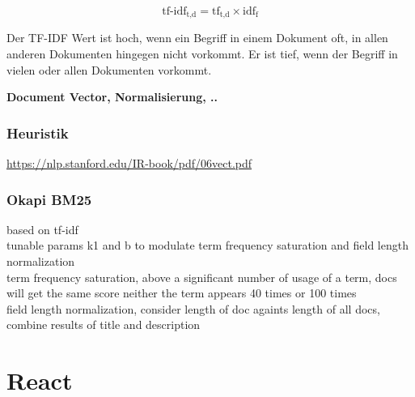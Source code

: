 \[
    \text{tf-idf}_{\text{t,d}} = \text{tf}_{\text{t,d}}\times\text{idf}_\text{f}
\]

Der TF-IDF Wert ist hoch, wenn ein Begriff in einem Dokument oft, in allen anderen Dokumenten hingegen nicht vorkommt. Er ist tief, wenn der Begriff in vielen oder allen Dokumenten vorkommt.


\textbf{Document Vector, Normalisierung, ..}

\cite{manning2008introduction}






\subsubsection{Heuristik}


\url{https://nlp.stanford.edu/IR-book/pdf/06vect.pdf}\\

\subsubsection{Okapi BM25}
based on tf-idf\\
tunable params k1 and b to modulate term frequency saturation and field length normalization\\
term frequency saturation, above a significant number of usage of a term, docs will get the same score neither the term appears 40 times or 100 times\\
field length normalization, consider length of doc againts length of all docs, combine results of title and description




\section{React}\label{react}

